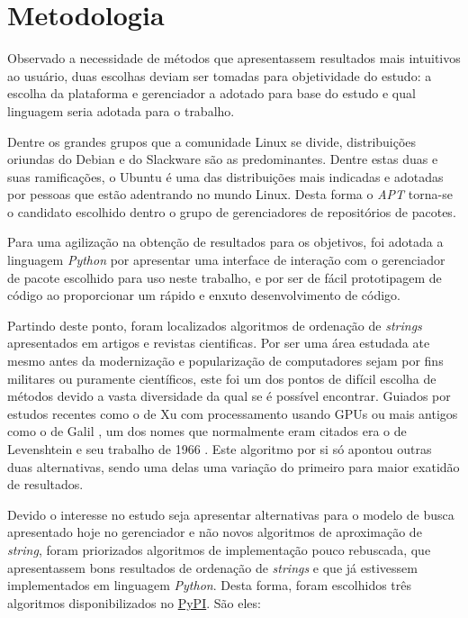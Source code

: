 \chapter{\nmu Metodologia} %
\label{cha:metodologia}


Observado a necessidade de métodos que apresentassem resultados mais intuitivos ao usuário, duas escolhas deviam ser tomadas para objetividade do estudo: a escolha da plataforma e gerenciador a adotado para base do estudo e qual linguagem seria adotada para o trabalho.

Dentre os grandes grupos que a comunidade Linux se divide, distribuições oriundas do Debian e do Slackware são as predominantes. Dentre estas duas e suas ramificações, o Ubuntu é uma das distribuições mais indicadas e adotadas por pessoas que estão adentrando no mundo Linux. Desta forma o \textit{APT} torna-se o candidato escolhido dentro o grupo de gerenciadores de repositórios de pacotes.


Para uma agilização na obtenção de resultados para os objetivos, foi adotada a linguagem \textit{Python} por apresentar uma interface de interação com o gerenciador de pacote escolhido para uso neste trabalho,  e por ser de fácil prototipagem de código ao proporcionar um rápido e enxuto desenvolvimento de código. 

Partindo deste ponto, foram localizados algoritmos de ordenação de \textit{strings} apresentados em artigos e revistas cientificas. Por ser uma área estudada ate mesmo antes da modernização e popularização de computadores sejam por fins militares ou puramente científicos, este foi um dos pontos de difícil escolha de métodos devido a vasta diversidade da qual se é possível encontrar. Guiados por estudos recentes como o de Xu \cite{xu2013bit} com processamento usando GPUs ou mais antigos como o de Galil \cite{galil1988data}, um dos nomes que normalmente eram citados era o de Levenshtein e seu trabalho de 1966 \cite{levenshtein1966}. Este algoritmo por si só apontou outras duas alternativas, sendo uma delas uma variação do primeiro para maior exatidão de resultados. 

Devido o interesse no estudo seja apresentar alternativas para o modelo de busca apresentado hoje no gerenciador e não novos algoritmos de aproximação de \textit{string}, foram priorizados algoritmos de implementação pouco rebuscada, que apresentassem bons resultados de ordenação de \textit{strings} e que já estivessem implementados em linguagem \textit{Python}. Desta forma, foram escolhidos três algoritmos disponibilizados no \href{https://pypi.python.org/}{PyPI}. São eles:

